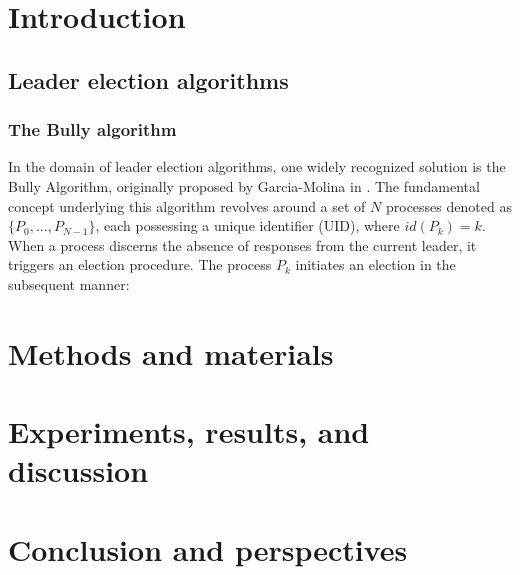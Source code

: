 \documentclass{article}
\begin{document}

\tableofcontents
\section{Introduction}
    \subsection{Leader election algorithms}
        
        \subsubsection{The Bully algorithm}
            In the domain of leader election algorithms, one widely recognized solution is the Bully Algorithm, originally proposed by Garcia-Molina in \cite{molina:1982}. The fundamental concept underlying this algorithm revolves around a set of \(N\) processes denoted as \(\{P_{0},...,P_{N-1}\}\), each possessing a unique identifier (UID), where \(id(P_{k}) =k\). When a process discerns the absence of responses from the current leader, it triggers an election procedure. The process \(P_{k}\) initiates an election in the subsequent manner:
            

            
\section{Methods and materials}
    
\section{Experiments, results, and discussion}

\section{Conclusion and perspectives}

\newpage
\end{document}
